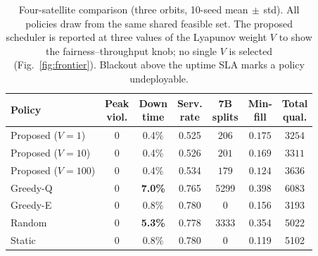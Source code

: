 \begin{table}[!t]
\centering\footnotesize
\setlength{\tabcolsep}{3pt}
\caption{\label{tab_split}Four-satellite comparison (three orbits, 10-seed
mean$\,\pm\,$std). All policies draw from the same shared feasible set. The
proposed scheduler is reported at three values of the Lyapunov weight $V$ to show
the fairness--throughput knob; no single $V$ is selected (Fig.~\ref{fig:frontier}).
Blackout above the uptime SLA marks a policy undeployable.}
\begin{tabular}{lcccccc}
\toprule
Policy & \makecell{Peak\\viol.} & \makecell{Down\\time} & \makecell{Serv.\\rate} & \makecell{7B\\splits} & \makecell{Min-\\fill} & \makecell{Total\\qual.} \\
\midrule
Proposed ($V{=}1$)   & 0 & 0.4\% & 0.525 & $206$ & $\mathbf{0.175}$ & $3254$ \\
Proposed ($V{=}10$)  & 0 & 0.4\% & 0.526 & $201$ & $0.169$ & $3311$ \\
Proposed ($V{=}100$) & 0 & 0.4\% & 0.534 & $179$ & $0.124$ & $3636$ \\
\midrule
Greedy-Q & 0 & \textbf{7.0\%} & 0.765 & 5299 & 0.398 & 6083 \\
Greedy-E & 0 & 0.8\% & 0.780 & 0 & 0.156 & 3193 \\
Random   & 0 & \textbf{5.3\%} & 0.778 & 3333 & 0.354 & 5022 \\
Static   & 0 & 0.8\% & 0.780 & 0 & 0.119 & 5102 \\
\bottomrule
\end{tabular}
\end{table}

